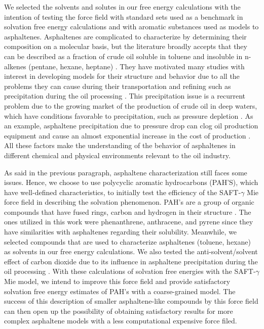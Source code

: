 We selected the solvents and solutes in our free energy calculations with the intention of testing the force field with standard sets used as a benchmark in solvation free energy calculations and with aromatic substances used as models to asphaltenes. Asphaltenes are complicated to characterize by determining their composition on a molecular basis, but the literature broadly accepts that they can be described as a fraction of crude oil soluble in toluene and insoluble in n-alkenes (pentane, hexane, heptane) \cite{SJOBLOM2003399}. They have motivated many studies with interest in developing models for their structure and behavior due to all the problems they can cause during their transportation and refining such as precipitation during the oil processing \cite{SJOBLOM20151}. This precipitation issue is a recurrent problem due to the growing market of the production of crude oil in deep waters, which have conditions favorable to precipitation, such as pressure depletion \cite{AIC:AIC10243}. As an example, asphaltene precipitation due to pressure drop can clog oil production equipment and cause an almost exponential increase in the cost of production \cite{doi:10.1021/ef010047l}. All these factors make the understanding of the behavior of asphaltenes in different chemical and physical environments relevant to the oil industry. 

As said in the previous paragraph, asphaltene characterization still faces some issues. Hence, we choose to use polycyclic aromatic hydrocarbons (PAH'S), which have well-defined characteristics, to initially test the efficiency of the SAFT-$\gamma$ Mie force field in describing the solvation phenomenon. PAH's are a group of organic compounds that have fused rings, carbon and hydrogen in their structure \cite{RAVINDRA20082895}. The ones utilized in this work were phenanthrene, anthracene, and pyrene since they have similarities with asphaltenes regarding their solubility. Meanwhile,  we selected compounds that are used to characterize asphaltenes (toluene, hexane) as solvents in our free energy calculations. We also tested the anti-solvent/solvent effect of carbon dioxide due to its influence in asphaltene precipitation during the oil processing \cite{SOROUSH2014405}. With these calculations of solvation free energies with the SAFT-$\gamma$ Mie model, we intend to improve this force field and provide satisfactory solvation free energy estimates of PAH's with a coarse-grained model. The success of this description of smaller asphaltene-like compounds by this force field can then open up the possibility of obtaining satisfactory results for more complex asphaltene models with a less computational expensive force filed.

